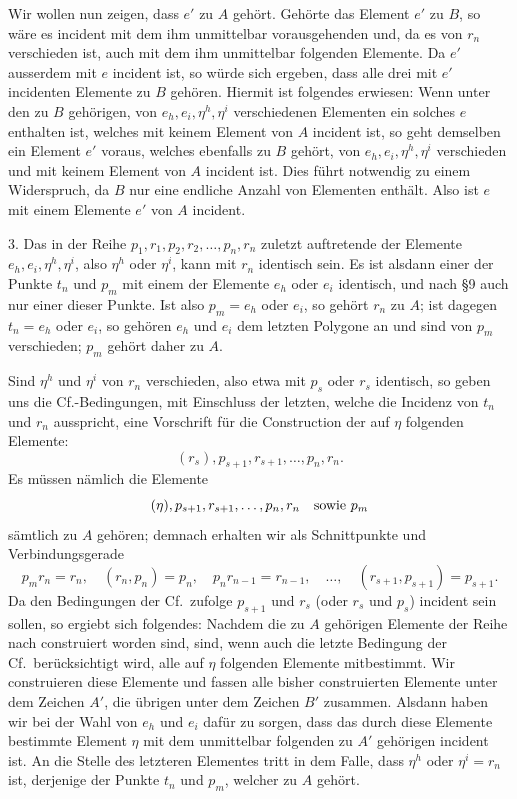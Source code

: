 \documentclass[11pt]{article}
\newcommand{\Cf}{\textup{Cf.}}
\begin{document}
Wir wollen nun zeigen, dass $e'$ zu $A$ gehört. Gehörte das Element $e'$ zu $B$, so wäre es incident mit dem ihm unmittelbar vorausgehenden und, da es von $r_n$ verschieden ist, auch mit dem ihm unmittelbar folgenden Elemente. Da $e'$ ausserdem mit $e$ incident ist, so würde sich ergeben, dass alle drei mit $e'$ incidenten Elemente zu $B$ gehören. Hiermit ist folgendes erwiesen: Wenn unter den zu $B$ gehörigen, von $e_h,e_i,\eta^h,\eta^i$ verschiedenen Elementen ein solches $e$ enthalten ist, welches mit keinem Element von $A$ incident ist, so geht demselben ein Element $e'$ voraus, welches ebenfalls zu $B$ gehört, von $e_h,e_i,\eta^h,\eta^i$ verschieden und mit keinem Element von $A$ incident ist. Dies führt notwendig zu einem Widerspruch, da $B$ nur eine endliche Anzahl von Elementen enthält. Also ist $e$ mit einem Elemente $e'$ von $A$ incident.

3. Das in der Reihe $p_1,r_1,p_2,r_2,\ldots,p_n,r_n$ zuletzt auftretende der Elemente $e_h,e_i,\eta^h,\eta^i$, also $\eta^h$ oder $\eta^i$, kann mit $r_n$ identisch sein. Es ist alsdann einer der Punkte $t_n$ und $p_m$ mit einem der Elemente $e_h$ oder $e_i$ identisch, und nach \S 9 auch nur einer dieser Punkte. Ist also $p_m=e_h$ oder $e_i$, so gehört $r_n$ zu $A$; ist dagegen $t_n=e_h$ oder $e_i$, so gehören $e_h$ und $e_i$ dem letzten Polygone an und sind von $p_m$ verschieden; $p_m$ gehört daher zu $A$.

Sind $\eta^h$ und $\eta^i$ von $r_n$ verschieden, also etwa mit $p_s$ oder $r_s$ identisch, so geben uns die \Cf-Bedingungen, mit Einschluss der letzten, welche die Incidenz von $t_n$ und $r_n$ ausspricht, eine Vorschrift für die Construction der auf $\eta$ folgenden Elemente:
\[
(r_s),p_{s+1},r_{s+1},\ldots,p_n,r_n.
\]
Es müssen nämlich die Elemente
\[
(\eta),p_{s+1},r_{s+1},\ldots,p_n,r_n\quad\hbox{sowie }p_m
\]
sämtlich zu $A$ gehören; demnach erhalten wir als Schnittpunkte und Verbindungsgerade
\[
p_m r_n=r_n,
\quad (r_n,p_n)=p_n,
\quad p_n r_{n-1}=r_{n-1},
\quad \ldots,
\quad (r_{s+1},p_{s+1})=p_{s+1}.
\]
Da den Bedingungen der \Cf\ zufolge $p_{s+1}$ und $r_s$ (oder $r_s$ und $p_s$) incident sein sollen, so ergiebt sich folgendes: Nachdem die zu $A$ gehörigen Elemente der Reihe nach construiert worden sind, sind, wenn auch die letzte Bedingung der \Cf\ berücksichtigt wird, alle auf $\eta$ folgenden Elemente mitbestimmt. Wir construieren diese Elemente und fassen alle bisher construierten Elemente unter dem Zeichen $A'$, die übrigen unter dem Zeichen $B'$ zusammen. Alsdann haben wir bei der Wahl von $e_h$ und $e_i$ dafür zu sorgen, dass das durch diese Elemente bestimmte Element $\eta$ mit dem unmittelbar folgenden zu $A'$ gehörigen incident ist. An die Stelle des letzteren Elementes tritt in dem Falle, dass $\eta^h$ oder $\eta^i=r_n$ ist, derjenige der Punkte $t_n$ und $p_m$, welcher zu $A$ gehört.
\end{document}
